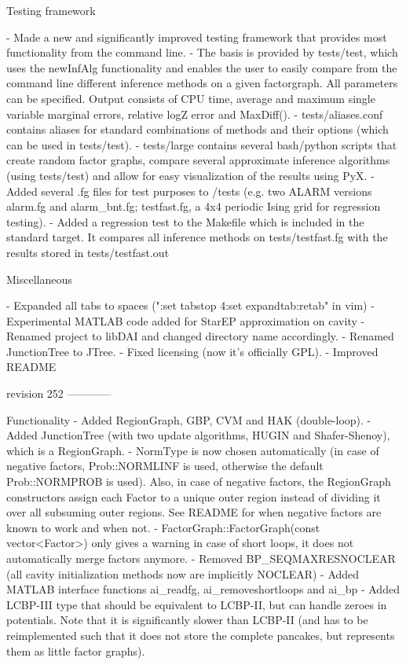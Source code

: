 \begin{DoxyVerbInclude}
Testing framework

- Made a new and significantly improved testing framework that provides most
  functionality from the command line.
- The basis is provided by tests/test, which uses the newInfAlg functionality
  and enables the user to easily compare from the command line different
  inference methods on a given factorgraph. All parameters can be specified.
  Output consists of CPU time, average and maximum single variable marginal
  errors, relative logZ error and MaxDiff().
- tests/aliases.conf contains aliases for standard combinations of methods
  and their options (which can be used in tests/test).
- tests/large contains several bash/python scripts that create random factor
  graphs, compare several approximate inference algorithms (using tests/test) and
  allow for easy visualization of the results using PyX.
- Added several .fg files for test purposes to /tests (e.g. two ALARM versions
  alarm.fg and alarm_bnt.fg; testfast.fg, a 4x4 periodic Ising grid for
  regression testing).
- Added a regression test to the Makefile which is included in the standard
  target.  It compares all inference methods on tests/testfast.fg with the
  results stored in tests/testfast.out

Miscellaneous

- Expanded all tabs to spaces (":set tabstop 4\n:set expandtab\n:retab" in vim)
- Experimental MATLAB code added for StarEP approximation on cavity
- Renamed project to libDAI and changed directory name accordingly.
- Renamed JunctionTree to JTree.
- Fixed licensing (now it's officially GPL).
- Improved README


revision 252
------------

Functionality
- Added RegionGraph, GBP, CVM and HAK (double-loop).
- Added JunctionTree (with two update algorithms, HUGIN and Shafer-Shenoy), which is a
  RegionGraph.
- NormType is now chosen automatically (in case of negative factors, Prob::NORMLINF is used,
  otherwise the default Prob::NORMPROB is used). Also, in case of negative factors, the
  RegionGraph constructors assign each Factor to a unique outer region instead of dividing
  it over all subsuming outer regions. See README for when negative factors are known to work
  and when not.
- FactorGraph::FactorGraph(const vector<Factor>) only gives a warning in case of short loops,
  it does not automatically merge factors anymore.
- Removed BP_SEQMAXRESNOCLEAR (all cavity initialization methods now are implicitly NOCLEAR)
- Added MATLAB interface functions ai_readfg, ai_removeshortloops and ai_bp
- Added LCBP-III type that should be equivalent to LCBP-II, but can handle zeroes
  in potentials. Note that it is significantly slower than LCBP-II (and has to be reimplemented
  such that it does not store the complete pancakes, but represents them as little factor graphs).


\end{DoxyVerbInclude}

